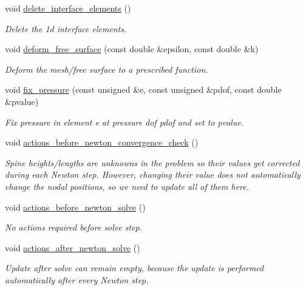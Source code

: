 \begin{DoxyCompactItemize}
void \hyperlink{classInterfaceProblem_ac2aaab086d9bbd3913ce8bc0d244413d}{delete\+\_\+interface\+\_\+elements} ()
\begin{DoxyCompactList}\small\item\em Delete the 1d interface elements. \end{DoxyCompactList}\item 
void \hyperlink{classInterfaceProblem_aa93d492461ac53f0d9f88516bce322dc}{deform\+\_\+free\+\_\+surface} (const double \&epsilon, const double \&k)
\begin{DoxyCompactList}\small\item\em Deform the mesh/free surface to a prescribed function. \end{DoxyCompactList}\item 
void \hyperlink{classInterfaceProblem_a9d1a04da451b6f41336cb6f3bd910633}{fix\+\_\+pressure} (const unsigned \&e, const unsigned \&pdof, const double \&pvalue)
\begin{DoxyCompactList}\small\item\em Fix pressure in element e at pressure dof pdof and set to pvalue. \end{DoxyCompactList}\item 
void \hyperlink{classInterfaceProblem_ab4193771472aefce4cd67261491cc344}{actions\+\_\+before\+\_\+newton\+\_\+convergence\+\_\+check} ()
\begin{DoxyCompactList}\small\item\em Spine heights/lengths are unknowns in the problem so their values get corrected during each Newton step. However, changing their value does not automatically change the nodal positions, so we need to update all of them here. \end{DoxyCompactList}\item 
void \hyperlink{classInterfaceProblem_ade63c8a74f666edf530460b989968b4f}{actions\+\_\+before\+\_\+newton\+\_\+solve} ()
\begin{DoxyCompactList}\small\item\em No actions required before solve step. \end{DoxyCompactList}\item 
void \hyperlink{classInterfaceProblem_aedc2e58b3d2f5f8c898a21ba2d245cee}{actions\+\_\+after\+\_\+newton\+\_\+solve} ()
\begin{DoxyCompactList}\small\item\em Update after solve can remain empty, because the update is performed automatically after every Newton step. \end{DoxyCompactList}\item 

\end{DoxyCompactItemize}
